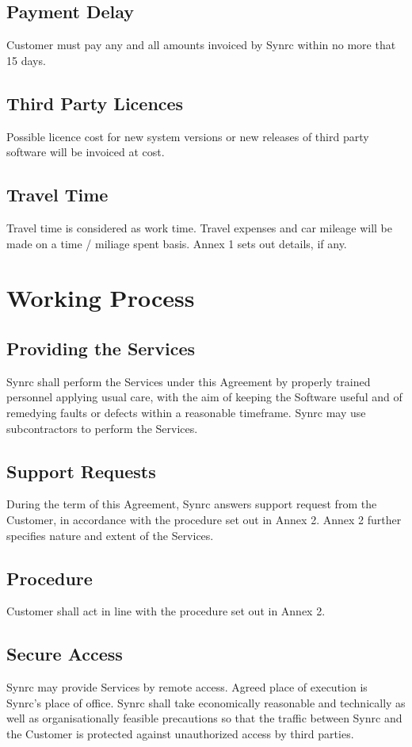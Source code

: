 \documentclass[11pt,oneside]{article}
\begin{document}
\subsection{Payment Delay}
Customer must pay any and all amounts invoiced by Synrc within no
more that 15 days.
\subsection{Third Party Licences}
Possible licence cost for new system versions or new releases of
third party software will be invoiced at cost.
\subsection{Travel Time}
Travel time is considered as work time. Travel expenses and car mileage
will be made on a time / miliage spent basis. Annex 1 sets out details, if any.

\section{Working Process}
\subsection{Providing the Services}
Synrc shall perform the Services under this Agreement by properly trained personnel
applying usual care, with the aim of keeping the Software useful and of remedying
faults or defects within a reasonable timeframe. Synrc may use subcontractors
to perform the Services.
\subsection{Support Requests}
During the term of this Agreement, Synrc answers support request from the Customer,
in accordance with the procedure set out in Annex 2. Annex 2 further specifies
nature and extent of the Services.
\subsection{Procedure}
Customer shall act in line with the procedure set out in Annex 2.
\subsection{Secure Access}
Synrc may provide Services by remote access. Agreed place of execution is Synrc's place
of office. Synrc shall take economically reasonable and technically as well as
organisationally feasible precautions so that the traffic between Synrc and
the Customer is protected against unauthorized access by third parties.
\end{document}
